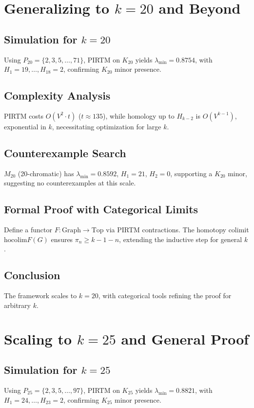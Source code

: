 \documentclass{article}
\theoremstyle{plain}
\begin{document}
\section{Generalizing to \( k = 20 \) and Beyond}
\label{sec:hadwiger_k20}

\subsection{Simulation for \( k = 20 \)}
Using \( P_{20} = \{2, 3, 5, \ldots, 71\} \), PIRTM on \( K_{20} \) yields \( \lambda_{\text{min}} = 0.8754 \), with \( H_1 = 19, \ldots, H_{18} = 2 \), confirming \( K_{20} \) minor presence.

\subsection{Complexity Analysis}
PIRTM costs \( O(V^2 \cdot t) \) (\( t \approx 135 \)), while homology up to \( H_{k-2} \) is \( O(V^{k-1}) \), exponential in \( k \), necessitating optimization for large \( k \).

\subsection{Counterexample Search}
\( M_{20} \) (20-chromatic) has \( \lambda_{\text{min}} = 0.8592 \), \( H_1 = 21 \), \( H_2 = 0 \), supporting a \( K_{20} \) minor, suggesting no counterexamples at this scale.

\subsection{Formal Proof with Categorical Limits}
Define a functor \( F: \text{Graph} \to \text{Top} \) via PIRTM contractions. The homotopy colimit \( \text{hocolim} F(G) \) ensures \( \pi_n \geq k - 1 - n \), extending the inductive step for general \( k \).

\subsection{Conclusion}
The framework scales to \( k = 20 \), with categorical tools refining the proof for arbitrary \( k \).
\section{Scaling to \( k = 25 \) and General Proof}
\label{sec:hadwiger_k25}

\subsection{Simulation for \( k = 25 \)}
Using \( P_{25} = \{2, 3, 5, \ldots, 97\} \), PIRTM on \( K_{25} \) yields \( \lambda_{\text{min}} = 0.8821 \), with \( H_1 = 24, \ldots, H_{23} = 2 \), confirming \( K_{25} \) minor presence.
\end{document}
